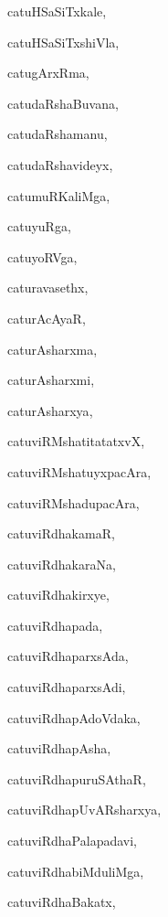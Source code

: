 \begin{multicols}{2}
{catuHSaSiTxkale}, \pageref{catuHSaSiTxkale}

{catuHSaSiTxshiVla}, \pageref{catuHSaSiTxshiVla}

{catugArxRma}, \pageref{catugArxRma}

{catudaRshaBuvana}, \pageref{catudaRshaBuvana}

{catudaRshamanu}, \pageref{catudaRshamanu}

{catudaRshavideyx}, \pageref{catudaRshavideyx}

{catumuRKaliMga}, \pageref{catumuRKaliMga}

{catuyuRga}, \pageref{catuyuRga}

{catuyoRVga}, \pageref{catuyoRVga}

{caturavasethx}, \pageref{caturavasethx}

{caturAcAyaR}, \pageref{caturAcAyaR}

{caturAsharxma}, \pageref{caturAsharxma}

{caturAsharxmi}, \pageref{caturAsharxmi}

{caturAsharxya}, \pageref{caturAsharxya}

{catuviRMshatitatatxvX}, \pageref{catuviRMshatitatatxvX}

{catuviRMshatuyxpacAra}, \pageref{catuviRMshatuyxpacAra}

{catuviRMshadupacAra}, \pageref{catuviRMshadupacAra}

{catuviRdhakamaR}, \pageref{catuviRdhakamaR}

{catuviRdhakaraNa}, \pageref{catuviRdhakaraNa}

{catuviRdhakirxye}, \pageref{catuviRdhakirxye}

{catuviRdhapada}, \pageref{catuviRdhapada}

{catuviRdhaparxsAda}, \pageref{catuviRdhaparxsAda}

{catuviRdhaparxsAdi}, \pageref{catuviRdhaparxsAdi}

{catuviRdhapAdoVdaka}, \pageref{catuviRdhapAdoVdaka}

{catuviRdhapAsha}, \pageref{catuviRdhapAsha}

{catuviRdhapuruSAthaR}, \pageref{catuviRdhapuruSAthaR}

{catuviRdhapUvARsharxya}, \pageref{catuviRdhapUvARsharxya}

{catuviRdhaPalapadavi}, \pageref{catuviRdhaPalapadavi}

{catuviRdhabiMduliMga}, \pageref{catuviRdhabiMduliMga}

{catuviRdhaBakatx}, \pageref{catuviRdhaBakatx}


\end{multicols}
